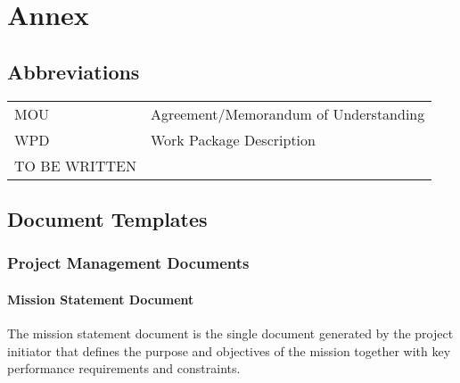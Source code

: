 \appendix
\chapter{Annex}

\section{Abbreviations}

\begin{tabular}{l l}
MOU & Agreement/Memorandum of Understanding \\
WPD & Work Package Description \\

TO BE WRITTEN
























\end{tabular}

\clearpage
\section{Document Templates}

\subsection{Project Management Documents}

\subsubsection{Mission Statement Document}
\label{app:Mission Statement Document}

The mission statement document is the single document generated by the project initiator that defines the purpose and objectives of the mission together with key performance requirements and constraints.

